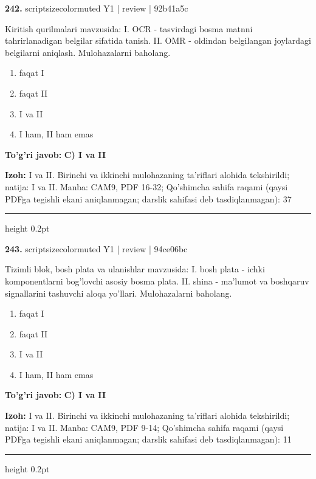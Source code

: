 \documentclass[10pt,a4paper]{article}
\begin{document}
{\bfseries\sffamily\color{ink} 242.} {scriptsizecolor{muted} Y1 | review | 92b41a5c}
\par
Kiritish qurilmalari mavzusida: I. OCR - tasvirdagi bosma matnni tahrirlanadigan belgilar sifatida tanish. II. OMR - oldindan belgilangan joylardagi belgilarni aniqlash. Mulohazalarni baholang.
\begin{enumerate}[label=\Alph*),leftmargin=9mm]
\item faqat I
\item faqat II
\item I va II
\item I ham, II ham emas
\end{enumerate}
\begin{tcolorbox}[enhanced,breakable,colback=teal!4,colframe=teal!60!black,boxrule=0.45pt,arc=1.2mm,left=2.7mm,right=2.7mm,top=1.8mm,bottom=1.8mm,before skip=2mm,after skip=2mm]
{\bfseries\sffamily\color{teal}To'g'ri javob:} \textbf{C) I va II}
\par\smallskip
{\bfseries Izoh:} I va II. Birinchi va ikkinchi mulohazaning ta'riflari alohida tekshirildi; natija: I va II. Manba: CAM9, PDF 16-32; Qo'shimcha sahifa raqami (qaysi PDFga tegishli ekani aniqlanmagan; darslik sahifasi deb tasdiqlanmagan): 37
\end{tcolorbox}
\vspace{2mm}\hrule height 0.2pt\vspace{3mm}

{\bfseries\sffamily\color{ink} 243.} {scriptsizecolor{muted} Y1 | review | 94ce06bc}
\par
Tizimli blok, bosh plata va ulanishlar mavzusida: I. bosh plata - ichki komponentlarni bog'lovchi asosiy bosma plata. II. shina - ma'lumot va boshqaruv signallarini tashuvchi aloqa yo'llari. Mulohazalarni baholang.
\begin{enumerate}[label=\Alph*),leftmargin=9mm]
\item faqat I
\item faqat II
\item I va II
\item I ham, II ham emas
\end{enumerate}
\begin{tcolorbox}[enhanced,breakable,colback=teal!4,colframe=teal!60!black,boxrule=0.45pt,arc=1.2mm,left=2.7mm,right=2.7mm,top=1.8mm,bottom=1.8mm,before skip=2mm,after skip=2mm]
{\bfseries\sffamily\color{teal}To'g'ri javob:} \textbf{C) I va II}
\par\smallskip
{\bfseries Izoh:} I va II. Birinchi va ikkinchi mulohazaning ta'riflari alohida tekshirildi; natija: I va II. Manba: CAM9, PDF 9-14; Qo'shimcha sahifa raqami (qaysi PDFga tegishli ekani aniqlanmagan; darslik sahifasi deb tasdiqlanmagan): 11
\end{tcolorbox}
\vspace{2mm}\hrule height 0.2pt\vspace{3mm}
\end{document}
